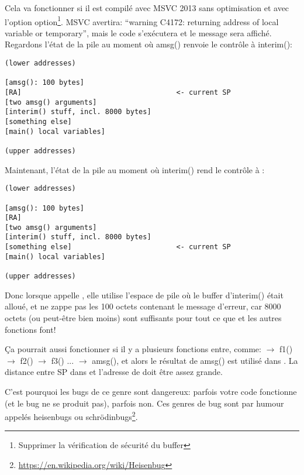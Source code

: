 Cela va fonctionner si il est compilé avec MSVC 2013 sans optimisation et avec l'option
 option\footnote{Supprimer la vérification de sécurité du buffer}.
MSVC avertira: ``warning C4172: returning address of local variable or temporary'',
mais le code s'exécutera et le message sera affiché.
Regardons l'état de la pile au moment où amsg() renvoie le contrôle à interim():

\begin{lstlisting}
(lower addresses)

[amsg(): 100 bytes]
[RA]                                     <- current SP
[two amsg() arguments]
[interim() stuff, incl. 8000 bytes]
[something else]
[main() local variables]

(upper addresses)
\end{lstlisting}

Maintenant, l'état de la pile au moment où interim() rend le contrôle à \main{}:

\begin{lstlisting}
(lower addresses)

[amsg(): 100 bytes]
[RA]
[two amsg() arguments]
[interim() stuff, incl. 8000 bytes]
[something else]                         <- current SP
[main() local variables]

(upper addresses)
\end{lstlisting}

Donc lorsque \main appelle \printf, elle utilise l'espace de pile où le buffer d'interim()
était alloué, et ne zappe pas les 100 octets contenant le message d'erreur, car 8000
octets (ou peut-être bien moins) sont suffisants pour tout ce que \printf et les autres
fonctions font!

Ça pourrait aussi fonctionner si il y a plusieurs fonctions entre, comme:
\main $\rightarrow$ f1() $\rightarrow$ f2() $\rightarrow$ f3() ... $\rightarrow$ amsg(),
et alors le résultat de amsg() est utilisé dans \main.
La distance entre \ac{SP} dans \main et l'adresse de  doit être assez grande.

C'est pourquoi les bugs de ce genre sont dangereux: parfois votre code fonctionne
(et le bug ne se produit pas), parfois non.
\label{heisenbug}
Ces genres de bug sont par humour appelés heisenbugs ou schrödinbugs\footnote{\url{https://en.wikipedia.org/wiki/Heisenbug}}.

